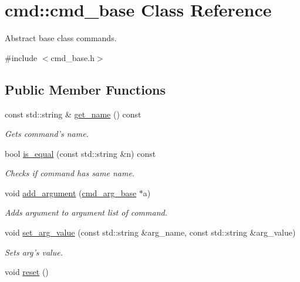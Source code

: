 \hypertarget{classcmd_1_1cmd__base}{\section{cmd\-:\-:cmd\-\_\-base Class Reference}
\label{classcmd_1_1cmd__base}
}


Abstract base class commands.  




{\ttfamily \#include $<$cmd\-\_\-base.\-h$>$}

\subsection*{Public Member Functions}
\begin{DoxyCompactItemize}
\item 
const std\-::string \& \hyperlink{classcmd_1_1cmd__base_a0a2177aba2d3cef3462bfafe3ffaf5b6}{get\-\_\-name} () const 
\begin{DoxyCompactList}\small\item\em Gets command's name. \end{DoxyCompactList}\item 
bool \hyperlink{classcmd_1_1cmd__base_a4e98978dd7eaaaa25bc290a6e9057133}{is\-\_\-equal} (const std\-::string \&n) const 
\begin{DoxyCompactList}\small\item\em Checks if command has same name. \end{DoxyCompactList}\item 
void \hyperlink{classcmd_1_1cmd__base_a4a9946f2ad47ebb8f31907c4069bf63e}{add\-\_\-argument} (\hyperlink{classcmd_1_1cmd__arg__base}{cmd\-\_\-arg\-\_\-base} $\ast$a)
\begin{DoxyCompactList}\small\item\em Adds argument to argument list of command. \end{DoxyCompactList}\item 
void \hyperlink{classcmd_1_1cmd__base_a76d5244c838a19180902422ece888146}{set\-\_\-arg\-\_\-value} (const std\-::string \&arg\-\_\-name, const std\-::string \&arg\-\_\-value)
\begin{DoxyCompactList}\small\item\em Sets arg's value. \end{DoxyCompactList}\item 
\hypertarget{classcmd_1_1cmd__base_ab7f760082a8db20b722ad3db5898f88d}{void \hyperlink{classcmd_1_1cmd__base_ab7f760082a8db20b722ad3db5898f88d}{reset} ()}\label{classcmd_1_1cmd__base_ab7f760082a8db20b722ad3db5898f88d}


\end{DoxyCompactItemize}
